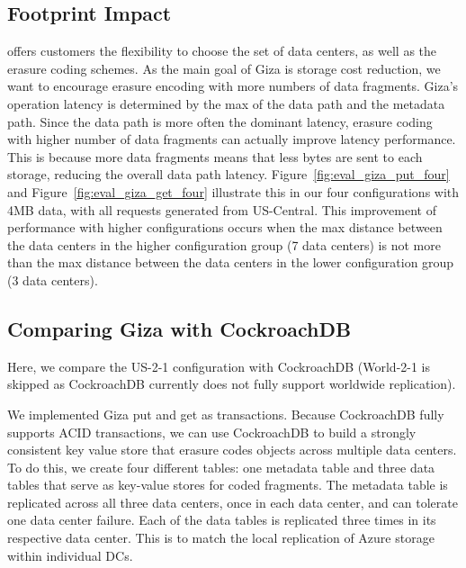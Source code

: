 \subsection{Footprint Impact}



\name offers customers the flexibility to choose the set of data centers, as well as the erasure coding schemes. As the main goal of Giza is storage cost reduction, we want to encourage erasure encoding with more numbers of data fragments. Giza’s operation latency is determined by the max of the data path and the metadata path.  Since the data path is more often the dominant latency, erasure coding with higher number of data fragments can actually improve latency performance. This is because more data fragments means that less bytes are sent to each storage, reducing the overall data path latency. Figure~\ref{fig:eval_giza_put_four} and  Figure~\ref{fig:eval_giza_get_four} illustrate this in our four configurations with 4MB data, with all requests generated from US-Central. This improvement of performance with higher configurations occurs when the max distance between the data centers in the higher configuration group (7 data centers) is not more than the max distance between the data centers in the lower configuration group (3 data centers).


\subsection{Comparing Giza with CockroachDB}

Here, we compare the US-2-1 configuration with CockroachDB (World-2-1 is skipped as CockroachDB currently does not fully support worldwide replication). %

We implemented Giza put and get as transactions. Because CockroachDB fully supports ACID transactions, we can use CockroachDB to build a strongly consistent key value store that erasure codes objects across multiple data centers. To do this, we create four different tables: one metadata table and three data tables that serve as key-value stores for coded fragments. The metadata table is replicated across all three data centers, once in each data center, and can tolerate one data center failure. Each of the data tables is replicated three times in its respective data center. %
This is to match the local replication of Azure storage within individual DCs.

